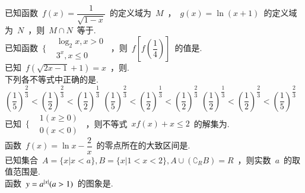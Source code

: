 \documentclass{BHCexam}
\begin{document}
\maketitle
\notice
\begin{questions}

\xuanze
\question 已知函数~$f(x)=\dfrac{1}{\sqrt{1-x}}$~的定义域为~$M$~，~$g(x)=\ln(x+1)$~的定义域为~$N$~，则~$M\cap N$~等于\xx.\\
\question 已知函数~$ \Bigg\{\begin{aligned}
&\log_2 x,x>0 \\
&3^x,x\leqslant 0
\end{aligned} $~，则~$f[f(\dfrac{1}{4})]$~的值是\xx.\\
\question 已知~$f(\sqrt{2x-1}+1)=x$~，则\xx.\\
\question 下列各不等式中正确的是\xx.\\
{$\left(\dfrac{1}{5} \right)^{\dfrac{2}{3}}<\left(\dfrac{1}{2} \right)^{\dfrac{2}{3}}<\left(\dfrac{1}{2} \right)^{\dfrac{1}{3}}$}
{$\left(\dfrac{1}{5} \right)^{\dfrac{2}{3}}<\left(\dfrac{1}{2} \right)^{\dfrac{1}{3}}<\left(\dfrac{1}{2} \right)^{\dfrac{2}{3}}$}
{$\left(\dfrac{1}{2} \right)^{\dfrac{1}{3}}<\left(\dfrac{1}{2} \right)^{\dfrac{2}{3}}<\left(\dfrac{1}{5} \right)^{\dfrac{2}{3}}$}
\question  已知~$ \Bigg\{\begin{aligned}
&1(x\geq 0) \\
&0(x<0)
\end{aligned} $~，则不等式~$xf(x)+x\leq 2$~的解集为\xx.\\
\onech{$(-\infty,1]$}{$[0,2]$}{$(-\infty,2]$}{$[0,1]$}
\question 函数~$f(x)=\ln x-\dfrac{2}{x}$~的零点所在的大致区间是\xx.\\
\question 已知集合~$A=\{x|x<a \},B=\{x|1<x<2 \},A\cup (\complement_R B)=R$~，则实数~$a$~的取值范围是\xx.\\
\question 函数~$y=a^{\left| x \right|}(a>1)$~的图象是\xx.\\
\end{questions}
\end{document}
